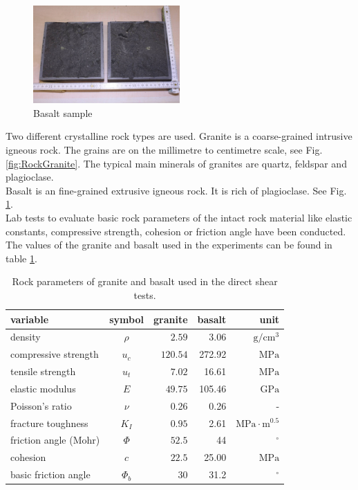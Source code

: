 \begin{figure}[!ht]
\begin{center}
\includegraphics[width=0.5\textwidth]{./figures/ExpRockBasalt.jpg}
\end{center}
\caption{Basalt sample}
\label{fig:RockBasalt}
\end{figure}

Two different crystalline rock types are used. Granite is a coarse-grained intrusive igneous rock. The grains are on the millimetre to centimetre scale, see Fig. \ref{fig:RockGranite}. The typical main minerals of granites are quartz, feldspar and plagioclase.\\
Basalt is an fine-grained extrusive igneous rock. It is rich of plagioclase. See Fig. \ref{fig:RockBasalt}.\\
Lab tests to evaluate basic rock parameters of the intact rock material like elastic constants, compressive strength, cohesion or friction angle have been conducted. The values of the granite and basalt used in the experiments can be found in table \ref{table:MEX7_rockParam}.\\
\begin{table}[!ht]
\begin{center}
\begin{tabular}{l c r r r}
variable & symbol & granite & basalt & unit\\
\hline
density & $\rho$ & $2.59$ &3.06 &$\text{g}/\text{cm}^3$\\
compressive strength & $u_c$ & $120.54$&272.92 &$\text{MPa}   $\\
tensile strength & $u_t$ & $7.02$&16.61 &$ \text{MPa}   $\\
elastic modulus & $E$ & $49.75$&105.46 &$ \text{GPa}   $\\
Poisson's ratio & $\nu$ & 0.26 & 0.26  & -\\
fracture toughness & $K_I$ & $0.95$& 2.61 &$\text{MPa}\cdot\text{m}^{0.5}$\\
friction angle (Mohr) & $\Phi$ &  $52.5$& 44 &$^\circ$\\
cohesion & $c$ &  $22.5$& 25.00  &$ \text{MPa}   $\\
basic friction angle &$\Phi_b$ &30 & 31.2 & $^\circ$\\
\end{tabular}
\caption{Rock parameters of granite and basalt used in the direct shear tests.}
\label{table:MEX7_rockParam}
\end{center}
\end{table}